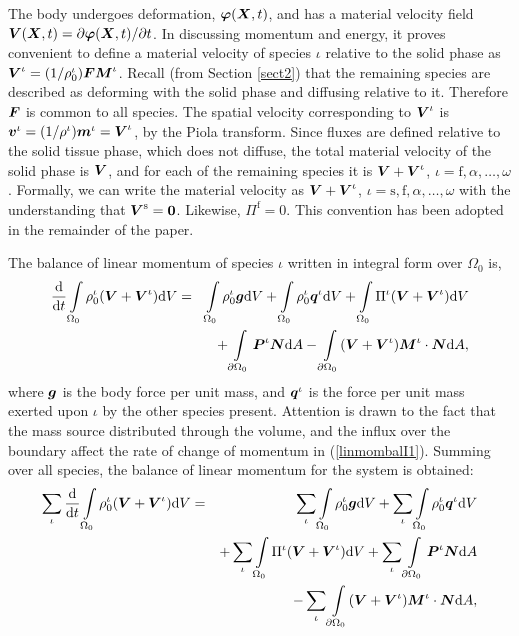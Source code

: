 The body undergoes deformation, $\mbox{\boldmath$\varphi$}(\mbox{\boldmath$ X$},t)$, and has a
material velocity field $\mbox{\boldmath$ V$}(\mbox{\boldmath$ X$},t) =
\partial\mbox{\boldmath$\varphi$}(\mbox{\boldmath$ X$},t)/\partial t$. In discussing momentum and energy, it proves convenient to define a
material velocity of species $\iota$ relative to the solid phase
as $\mbox{\boldmath$ V$}^\iota = (1/\rho_0^\iota)\mbox{\boldmath$ F$}\mbox{\boldmath$ M$}^\iota$. Recall (from
Section \ref{sect2}) that the remaining species are described as
deforming with the solid phase and diffusing relative to it.
Therefore $\mbox{\boldmath$ F$}$ is common to all species. The spatial velocity
corresponding to $\mbox{\boldmath$ V$}^\iota$ is $\mbox{\boldmath$ v$}^\iota =
(1/\rho^\iota)\mbox{\boldmath$ m$}^\iota = \mbox{\boldmath$ V$}^\iota$, by the Piola transform.
Since fluxes are defined relative to the solid tissue phase, which
does not diffuse, the total material velocity of the solid phase
is $\mbox{\boldmath$ V$}$, and for each of the remaining species it is $\mbox{\boldmath$ V$} +
\mbox{\boldmath$ V$}^\iota$, $\iota = \mathrm{f},\alpha,\dots,\omega$. Formally, we
can write the material velocity as  $\mbox{\boldmath$ V$} + \mbox{\boldmath$ V$}^\iota$, $\iota =
\mathrm{s},\mathrm{f},\alpha,\dots,\omega$ with the understanding
that $\mbox{\boldmath$ V$}^\mathrm{s} = {\bf 0}$. Likewise, $\Pi^\mathrm{f} = 0$.
This convention has been adopted in the remainder of the paper.

The balance of linear momentum of species $\iota$ written in
integral form over $\Omega_0$ is,
\begin{eqnarray}
\frac{\mathrm{d}}{\mathrm{d}t} \int\limits_{\Omega_0}
\rho_0^\iota(\mbox{\boldmath$ V$}+\mbox{\boldmath$ V$}^\iota) \mathrm{d}V &=& \int\limits_{\Omega_0}
\rho^\iota_0\mbox{\boldmath$ g$} \mathrm{d}V + \int\limits_{\Omega_0}
\rho^\iota_0\mbox{\boldmath$ q$}^\iota \mathrm{d}V + \int\limits_{\Omega_0}
\Pi^\iota(\mbox{\boldmath$ V$}+\mbox{\boldmath$ V$}^\iota) \mathrm{d}V \nonumber\\
& &+ \int\limits_{\partial \Omega_0}\mbox{\boldmath$ P$}^\iota\mbox{\boldmath$ N$} \mathrm{d}A -
\int\limits_{\partial \Omega_0}(\mbox{\boldmath$ V$}+\mbox{\boldmath$ V$}^\iota)\mbox{\boldmath$ M$}^\iota\cdot\mbox{\boldmath$ N$}
\mathrm{d}A, \label{linmombalI1}
\end{eqnarray}
\noindent where $\mbox{\boldmath$ g$}$ is the body force per unit mass, and
$\mbox{\boldmath$ q$}^\iota$ is the force per unit mass exerted upon $\iota$ by the
other species present. Attention is drawn to the fact that the
mass source distributed through the volume, and the influx over
the boundary affect the rate of change of momentum in
(\ref{linmombalI1}). Summing over all species, the balance of
linear momentum for the system is obtained:
\begin{eqnarray}
\sum\limits_{\iota}\frac{\mathrm{d}}{\mathrm{d}t}
\int\limits_{\Omega_0} \rho_0^\iota(\mbox{\boldmath$ V$}+\mbox{\boldmath$ V$}^\iota) \mathrm{d}V &=&
\sum\limits_{\iota}\int\limits_{\Omega_0} \rho^\iota_0\mbox{\boldmath$ g$}
\mathrm{d}V + \sum\limits_{\iota}\int\limits_{\Omega_0}
\rho^\iota_0\mbox{\boldmath$ q$}^\iota \mathrm{d}V\nonumber\\& & +
\sum\limits_{\iota}\int\limits_{\Omega_0} \Pi^\iota(\mbox{\boldmath$ V$}+\mbox{\boldmath$ V$}^\iota)
\mathrm{d}V + \sum\limits_{\iota} \int\limits_{\partial
\Omega_0}\mbox{\boldmath$ P$}^\iota\mbox{\boldmath$ N$} \mathrm{d}A\nonumber\\
& & - \sum\limits_{\iota}\int\limits_{\partial
\Omega_0}(\mbox{\boldmath$ V$}+\mbox{\boldmath$ V$}^\iota)\mbox{\boldmath$ M$}^\iota\cdot\mbox{\boldmath$ N$} \mathrm{d}A,
\label{linmombalall}
\end{eqnarray}

